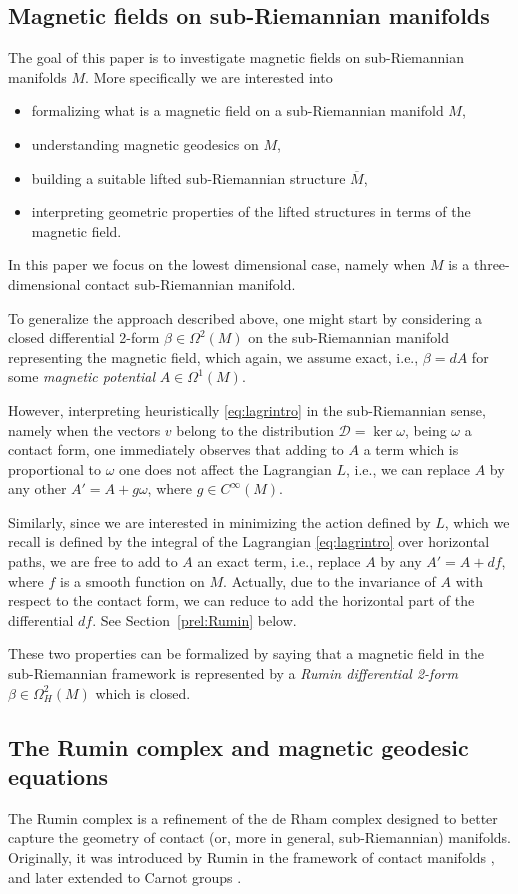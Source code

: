\documentclass{amsart}
\theoremstyle{plain}
\theoremstyle{definition}
\theoremstyle{remark}
\newcommand{\sr}{sub-{R}ie\-man\-nian }
\newcommand{\distr}{\mathcal{D}}								%
\newcommand{\lift}[1]{\overline{#1}} 							%
\begin{document}
\subsection{Magnetic fields on \sr manifolds}
The goal of this paper is to investigate magnetic fields on \sr manifolds $M$. More specifically we are interested into 
\begin{itemize}
\item[(i)] formalizing what is a magnetic field on a \sr manifold $M$, 
\item[(ii)] understanding magnetic geodesics on $M$, 
\item[(iii)] building a suitable lifted sub-Riemannian structure $\lift M$,
\item[(iv)] interpreting geometric properties of the lifted structures in terms of the magnetic field. 
\end{itemize}
In this paper we focus on the lowest dimensional case, namely when $M$ is a three-dimensional contact \sr manifold.

To generalize the approach described above, one might start by considering a closed differential 2-form $\beta\in \Omega^{2}(M)$ on the \sr manifold representing the magnetic field, which again, we assume exact, i.e., $\beta=dA$ for some \emph{magnetic potential} $A\in \Omega^{1}(M)$. 

However, interpreting heuristically \eqref{eq:lagrintro} in the \sr sense, namely when the vectors $v$ belong to the distribution $\distr=\ker\omega$, being $\omega$ a contact form, one immediately observes that adding to $A$ a term which is proportional to $\omega$ one does not affect the Lagrangian $L$, i.e., we can replace $A$ by any other $A'=A+g\omega$, where $g\in C^{\infty}(M)$. 

Similarly, since we are interested in minimizing the action defined by $L$, which we recall is defined by the integral of the Lagrangian \eqref{eq:lagrintro} over horizontal paths, we are free to add to $A$ an exact term, i.e., replace $A$ by any $A'=A+df$, where $f$ is a smooth function on $M$. Actually, due to the invariance of $A$ with respect to the contact form, we can reduce to add the horizontal part of the differential $df$.  See Section~\ref{prel:Rumin} below.

These two properties can be formalized by saying that a magnetic field in the \sr framework is represented by a \emph{Rumin differential 2-form} $\beta\in \Omega^{2}_{H}(M)$ which is closed.

\subsection{The Rumin complex and magnetic geodesic equations}
The Rumin complex is a refinement of the de Rham complex designed to better capture the geometry of contact (or, more in general, sub-Rie\-man\-nian) manifolds. Originally, it was introduced by Rumin in the framework of contact manifolds \cites{RuminContact}, and later extended to Carnot groups \cites{Rum00a}.  
\end{document}
